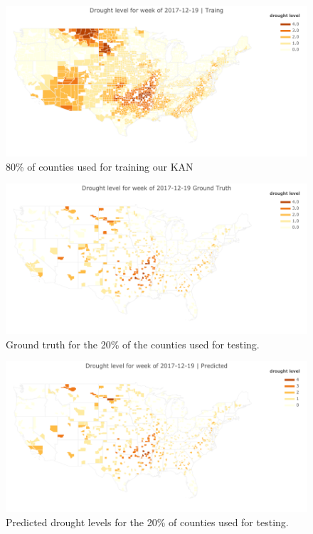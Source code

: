 \documentclass{article}
\begin{document}
\begin{figure}[hbt!]
    \centering
    \includegraphics[width =  \textwidth]{training.png}
    \caption{80\% of counties used for training our KAN}
    \label{fig:training}
\end{figure}


\begin{figure}[hbt!]
    \centering
    \includegraphics[width =  \textwidth]{ground_truth.png}
    \caption{Ground truth for the 20\% of the counties used for testing.}
    \label{fig:ground_truth}
\end{figure}


\begin{figure}[hbt!]
    \centering
    \includegraphics[width =  \textwidth]{predicted.png}
    \caption{Predicted drought levels for the 20\% of counties used for testing.}
    \label{fig:predicted}
\end{figure}
\end{document}
